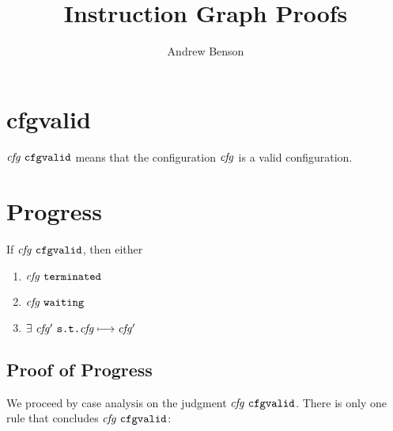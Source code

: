 \documentclass[12pt]{article}
\title{Instruction Graph Proofs}
\author{Andrew Benson}
\date{}
\begin{document}
\maketitle

\thispagestyle{simple}

\section{cfgvalid}

$\cfgvalid{\nterm{cfg}}$ means that the configuration $\nterm{cfg}$ is a valid
configuration.

\begin{mathpar}
\end{mathpar}

\section{Progress}

If $\cfgvalid{\nterm{cfg}}$, then either
\begin{enumerate}
  \item $\terminated{\nterm{cfg}}$
  \item $\waiting{\nterm{cfg}}$
  \item $\exists\ \nterm{cfg'}\ \texttt{s.t.} \steps{\nterm{cfg}}{\nterm{cfg'}}$
\end{enumerate}

\subsection{Proof of Progress}

We proceed by case analysis on the judgment $\cfgvalid{\nterm{cfg}}$. There is
only one rule that concludes $\cfgvalid{\nterm{cfg}}$:

\begin{mathpar}
\end{mathpar}
\end{document}
